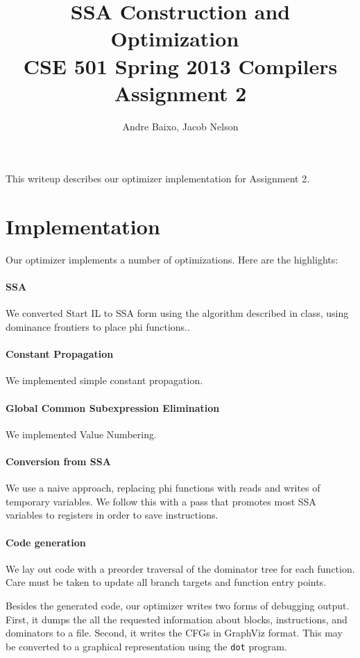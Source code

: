 \documentclass[10pt,twocolumn]{article}
\begin{document}
\title{SSA Construction and Optimization\ \\
  \small CSE 501 Spring 2013 Compilers Assignment 2}
\author{Andre Baixo, Jacob Nelson}
\maketitle

This writeup describes our optimizer implementation for Assignment 2.

\section{Implementation}

Our optimizer implements a number of optimizations. Here are the highlights:

\paragraph{SSA} 
We converted Start IL to SSA form using the algorithm described in
class, using dominance frontiers to place phi functions..

\paragraph{Constant Propagation} 
We implemented simple constant propagation.

\paragraph{Global Common Subexpression Elimination} 
We implemented Value Numbering.

\paragraph{Conversion from SSA} 
We use a naive approach, replacing phi functions with reads and writes
of temporary variables. We follow this with a pass that promotes most
SSA variables to registers in order to save instructions.

\paragraph{Code generation} 
We lay out code with a preorder traversal of the dominator tree for
each function. Care must be taken to update all branch targets and
function entry points.


Besides the generated code, our optimizer writes two forms of
debugging output. First, it dumps the all the requested information
about blocks, instructions, and dominators to a file. Second, it
writes the CFGs in GraphViz format. This may be converted to a
graphical representation using the \texttt{dot} program.
\end{document}
